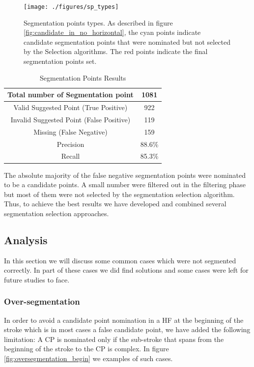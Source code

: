 \documentclass[journal,compsoc]{IEEEtran}
\begin{document}
\begin{figure}
\centering
\texttt{[image: ./figures/sp\_types]}
\caption{Segmentation points types. As described in figure \ref{fig:candidate_in_no_horizontal}, the cyan points indicate candidate segmentation points that were nominated but not selected by the Selection algorithms. The red points indicate the final segmentation points set.}
\label{fig:sp_types}
\end{figure}

\begin{table}[h]
\caption{Segmentation Points Results}
\begin{tabular}{ | c | c | }
  \hline
  Total number of Segmentation point & 1081 \\
  \hline
  Valid Suggested Point (True Positive) & 922 \\
  \hline
  Invalid Suggested Point (False Positive) & 119 \\
  \hline
  Missing (False Negative) & 159 \\
  \hline                                    
  Precision & 88.6\% \\ 
 \hline
  Recall &  85.3\% \\ 
 \hline
\end{tabular}
\centering
\label{table:sp_results} 
\end{table}

The absolute majority of the false negative segmentation points were nominated to be a candidate points. A small number were filtered out in the filtering phase but most of them were not selected by the segmentation selection algorithm. Thus, to achieve the best results we have developed and combined several segmentation selection approaches.

\subsection{Analysis}
In this section we will discuss some common cases which were not segmented correctly. In part of these cases we did find solutions and some cases were left for future studies to face. 
\subsubsection{Over-segmentation}
In order to avoid a candidate point nomination in a HF at the beginning of the stroke which is in most cases a false candidate point, we have added the following limitation: A CP is nominated only if the sub-stroke that spans from the beginning of the stroke to the CP is complex.
In figure \ref{fig:oversegmentation_begin} we examples of such cases.
\end{document}

